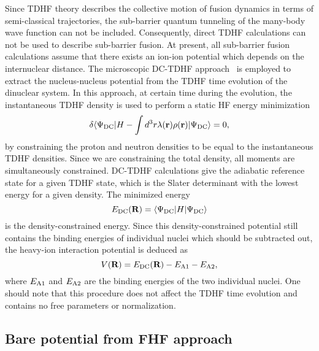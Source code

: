 \documentclass[aps,prc,twocolumn,showpacs,superscriptaddress,longbibliography,nofootinbib,floatfix,10pt]{revtex4-1}
\begin{document}
Since TDHF theory describes the collective motion of fusion dynamics in terms of semi-classical trajectories, the sub-barrier quantum
tunneling of the many-body wave function can not be included. Consequently, direct TDHF calculations can not be used to describe sub-barrier fusion.
At present, all sub-barrier fusion calculations assume that there exists an ion-ion potential which depends on the internuclear distance.
The microscopic DC-TDHF approach~\cite{Umar2006_PRC74-021601} is employed to extract the nucleus-nucleus potential from the TDHF time evolution of the dinuclear system.
In this approach, at certain time during the evolution, the instantaneous TDHF density is used to perform a static HF energy minimization
\begin{equation}
\delta \langle \Psi_{\rm DC}|H-\int d^3r \lambda(\textbf{r})\rho(\textbf{r})|\Psi_{\rm DC}\rangle=0,
\end{equation}
by constraining the proton and neutron densities to be equal to the instantaneous TDHF densities. Since we are constraining the total density,
all moments are simultaneously constrained. DC-TDHF calculations give the adiabatic reference state for a given TDHF state, which is the Slater
determinant with the lowest energy for a given density.
The minimized energy
\begin{equation}
E_{\rm {DC}}(\textbf R)=\langle \Psi_{\rm DC}|H|\Psi_{\rm DC}\rangle
\end{equation}
is the density-constrained energy.
Since this density-constrained potential still contains the binding energies of individual nuclei which should be subtracted out,
the heavy-ion interaction potential is deduced as
\begin{equation}
V(\textbf R)=E_{\rm {DC}}(\textbf R)-E_{\rm {A1}}-E_{\rm {A2}},
\label{VB}
\end{equation}
where $E_{\rm {A1}}$ and $E_{\rm {A2}}$ are the binding energies of the two individual nuclei.
One should note that this procedure does not affect the TDHF time evolution and contains no free parameters or normalization.

\subsection{Bare potential from FHF approach}
\end{document}
